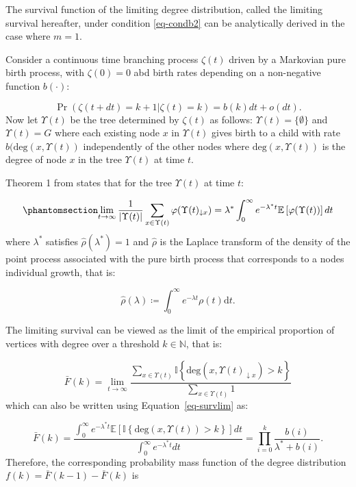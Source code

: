 \documentclass[
  sn-basic,
]{sn-jnl}
\theoremstyle{plain}
\theoremstyle{plain}
\theoremstyle{remark}
\begin{document}
The survival function of the limiting degree distribution, called the
limiting survival hereafter, under condition \ref{eq-condb2} can be
analytically derived in the case where \(m=1\).

Consider a continuous time branching process \(\zeta(t)\) driven by a
Markovian pure birth process, with \(\zeta(0)=0\) abd birth rates
depending on a non-negative function \(b(\cdot)\):

\[
\Pr(\zeta(t+dt)=k+1|\zeta(t)=k) = b(k)dt + o(dt).
\] Now let \(\Upsilon(t)\) be the tree determined by \(\zeta(t)\) as
follows: \(\Upsilon(t)=\{\emptyset\}\) and \(\Upsilon(t)=G\) where each
existing node \(x\) in \(\Upsilon(t)\) gives birth to a child with rate
\(b(\mathrm{deg}(x, \Upsilon(t))\) independently of the other nodes
where \(\mathrm{deg}(x, \Upsilon(t))\) is the degree of node \(x\) in
the tree \(\Upsilon(t)\) at time \(t\).

Theorem 1 from \citet{rudas07} states that for the tree \(\Upsilon(t)\)
at time \(t\):

\begin{equation}\phantomsection\label{eq-survlim}{
\lim_{t\rightarrow\infty}\frac{1}{|\Upsilon(t)|}\sum_{x\in\Upsilon(t)}\varphi(\Upsilon(t)_{\downarrow x}) = \lambda^* \int_0^\infty e^{-\lambda^* t}\mathbb E\left[\varphi(\Upsilon(t))\right]dt
}\end{equation} where \(\lambda^*\) satisfies \(\hat\rho(\lambda^*)=1\)
and \(\hat\rho\) is the Laplace transform of the density of the point
process associated with the pure birth process that corresponds to a
nodes individual growth, that is:

\[
\hat\rho(\lambda) \coloneq \int_0^\infty e^{-\lambda t}\rho(t)\mathrm{d}t.
\]

The limiting survival can be viewed as the limit of the empirical
proportion of vertices with degree over a threshold \(k\in\mathbb N\),
that is:

\[
\bar F(k) = \lim_{t\rightarrow\infty}\frac{\sum_{x\in\Upsilon(t)}\mathbb I\left\{\text{deg}(x,\Upsilon(t)_{\downarrow x})>k\right\}}{\sum_{x\in\Upsilon(t)} 1}
\] which can also be written using Equation~\ref{eq-survlim} as:

\[
\bar F(k) = \frac{\int_0^\infty e^{-\lambda^* t}\mathbb E\left[\mathbb I\left\{\text{deg}(x,\Upsilon(t))>k\right\}\right]dt}{\int_0^\infty e^{-\lambda^* t}dt} = \prod_{i=0}^k\frac{b(i)}{\lambda^* + b(i)}.
\] Therefore, the corresponding probability mass function of the degree
distribution \(f(k) = \bar F(k-1) - \bar F(k)\) is
\end{document}
